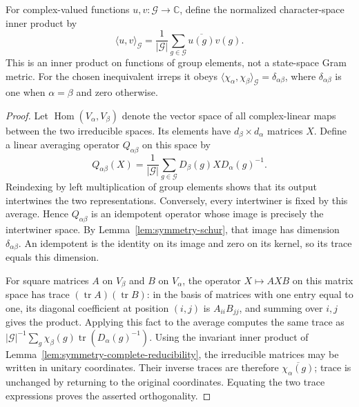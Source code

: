 \begin{lemma}
\label{lem:symmetry-character-orthogonality}
For complex-valued functions $u,v:\mathcal G\to\mathbb C$, define the
normalized character-space inner product by
\begin{equation}
  \langle u,v\rangle_{\mathcal G}
    =\frac{1}{|\mathcal G|}\sum_{g\in\mathcal G}\overline{u(g)}v(g).
  \label{eq:symmetry-character-inner-product}
\end{equation}
This is an inner product on functions of group elements, not a state-space
Gram metric. For the chosen inequivalent irreps it obeys
$\langle\chi_\alpha,\chi_\beta\rangle_{\mathcal G}=\delta_{\alpha\beta}$,
where $\delta_{\alpha\beta}$ is one when $\alpha=\beta$ and zero otherwise.
\end{lemma}
\begin{proof}
Let $\operatorname{Hom}(V_\alpha,V_\beta)$ denote the vector space of all
complex-linear maps between the two irreducible spaces. Its elements have
$d_\beta\times d_\alpha$ matrices $X$. Define a linear averaging operator
$Q_{\alpha\beta}$ on this space by
\begin{equation}
  Q_{\alpha\beta}(X)=\frac{1}{|\mathcal G|}\sum_{g\in\mathcal G}
      D_\beta(g)X D_\alpha(g)^{-1}.
  \label{eq:symmetry-intertwiner-average}
\end{equation}
Reindexing by left multiplication of group elements shows that its output
intertwines the two representations. Conversely, every intertwiner is fixed
by this average. Hence $Q_{\alpha\beta}$ is an idempotent operator whose
image is precisely the intertwiner space. By Lemma~\ref{lem:symmetry-schur},
that image has dimension $\delta_{\alpha\beta}$. An idempotent is the
identity on its image and zero on its kernel, so its trace equals this
dimension.

For square matrices $A$ on $V_\beta$ and $B$ on $V_\alpha$, the operator
$X\mapsto AXB$ on this matrix space has trace
$(\operatorname{tr}A)(\operatorname{tr}B)$: in the basis of matrices with
one entry equal to one, its diagonal coefficient at position $(i,j)$ is
$A_{ii}B_{jj}$, and summing over $i,j$ gives the product. Applying this fact
to the average computes the same trace as
$|\mathcal G|^{-1}\sum_g\chi_\beta(g)\operatorname{tr}(D_\alpha(g)^{-1})$.
Using the invariant inner product of
Lemma~\ref{lem:symmetry-complete-reducibility}, the irreducible matrices may
be written in unitary coordinates. Their inverse
traces are therefore $\overline{\chi_\alpha(g)}$; trace is unchanged by
returning to the original coordinates. Equating the two trace expressions
proves the asserted orthogonality.
\end{proof}

